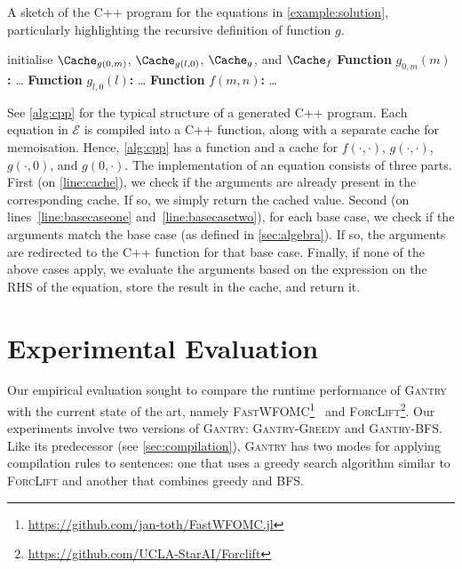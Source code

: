 \documentclass[a4paper,UKenglish,cleveref, autoref, thm-restate]{lipics-v2021}
\newcommand{\Cranetwo}{\textsc{Gantry}}
\newcommand{\Cranebfs}{\textsc{Gantry-BFS}}
\newcommand{\Cranegreedy}{\textsc{Gantry-Greedy}}
\begin{document}
\begin{algorithm}[t]
  \caption{A sketch of the C++ program for the equations in \cref{example:solution}, particularly highlighting the recursive definition of function $g$.}\label{alg:cpp}
  initialise $\Cache_{g(0, m)}$, $\Cache_{g(l, 0)}$, $\Cache_{g}$, and
  $\Cache_{f}$\; \DontPrintSemicolon \textbf{Function} $g_{0,m}(m)$\textbf{:}
  \dots\; \textbf{Function} $g_{l,0}(l)$\textbf{:} \dots\; \PrintSemicolon
   \DontPrintSemicolon \textbf{Function} $f(m, n)$\textbf{:}
  \dots\; \PrintSemicolon {}
\end{algorithm}

See \cref{alg:cpp} for the typical structure of a generated C++ program. Each
equation in $\mathcal{E}$ is compiled into a C++ function, along with a separate
cache for memoisation. Hence, \cref{alg:cpp} has a function and a cache for
$f(\cdot, \cdot)$, $g(\cdot, \cdot)$, $g(\cdot, 0)$, and $g(0, \cdot)$. The
implementation of an equation consists of three parts. First (on
\autoref{line:cache}), we check if the arguments are already present in the
corresponding cache. If so, we simply return the cached value. Second (on
lines~\ref{line:basecaseone} and~\ref{line:basecasetwo}), for each base case, we
check if the arguments match the base case (as defined in \cref{sec:algebra}).
If so, the arguments are redirected to the C++ function for that base case.
Finally, if none of the above cases apply, we evaluate the arguments based on
the expression on the RHS of the equation, store the result in the cache, and
return it.

\section{Experimental Evaluation}\label{sec:experiments}

Our empirical evaluation sought to compare the runtime performance of
{\Cranetwo} with the current state of the art, namely
\textsc{FastWFOMC}\footnote{\url{https://github.com/jan-toth/FastWFOMC.jl}}~\cite{DBLP:conf/kr/TothK24,DBLP:conf/uai/BremenK21}
and \textsc{ForcLift}\footnote{\url{https://github.com/UCLA-StarAI/Forclift}}.
Our experiments involve two versions of \Cranetwo{}: \Cranegreedy{} and
\Cranebfs{}. Like its predecessor (see \cref{sec:compilation}), \Cranetwo{} has
two modes for applying compilation rules to sentences: one that uses a greedy
search algorithm similar to \textsc{ForcLift} and another that combines greedy
and BFS\@.
\end{document}
